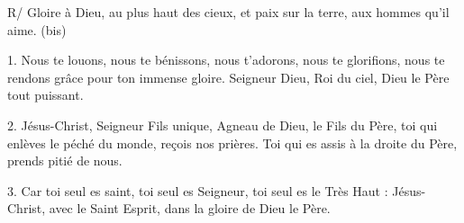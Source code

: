 R/ Gloire à Dieu, au plus haut des cieux, et paix sur la terre, aux hommes qu'il aime. (bis)

1. Nous te louons, nous te bénissons, nous t’adorons, nous te glorifions, nous
te rendons grâce pour ton immense gloire. Seigneur Dieu, Roi du ciel, Dieu
le Père tout puissant.

2. Jésus-Christ, Seigneur Fils unique, Agneau de Dieu, le Fils du Père, toi qui
enlèves le péché du monde, reçois nos prières. Toi qui es assis à la droite
du Père, prends pitié de nous.

3. Car toi seul es saint, toi seul es Seigneur, toi seul es le Très Haut :
Jésus-Christ, avec le Saint Esprit, dans la gloire de Dieu le Père.

